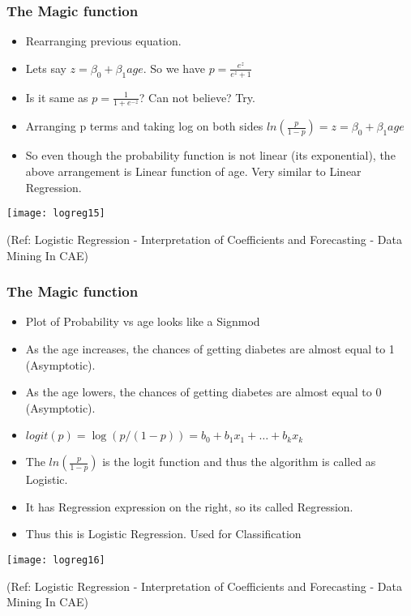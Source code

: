 \begin{frame}[fragile]\frametitle{The Magic function}
 \begin{itemize}
\item Rearranging previous equation.
\item Lets say $z = \beta_0 + \beta_1 age$. So we have $p = \frac{e^z}{e^z + 1}$
\item Is it same as $p = \frac{1}{1 + e^{-z}}$? Can not believe? Try.
\item Arranging p terms and taking log on both sides $ln(\frac{p}{1-p}) = z = \beta_0 + \beta_1 age$
\item So even though the probability function is not linear (its exponential), the above arrangement is Linear function of age. Very similar to Linear Regression.
\end{itemize}

\begin{center}
\texttt{[image: logreg15]}
\end{center}

{\tiny (Ref: Logistic Regression - Interpretation of Coefficients and Forecasting - Data Mining In CAE)}

\end{frame}

\begin{frame}[fragile]\frametitle{The Magic function}
 \begin{itemize}
\item Plot of Probability vs age looks like a Signmod
\item As the age increases, the chances of getting diabetes are almost equal to 1 (Asymptotic).
\item As the age lowers, the chances of getting diabetes are almost equal to 0 (Asymptotic).
\item $logit(p) = \log(p/(1-p)) = b_0 + b_1 x_1 +  \ldots + b_k x_k$
\item The $ln(\frac{p}{1-p})$ is the logit function and thus the algorithm is called as Logistic.
\item It has Regression expression on the right, so its called Regression.
\item Thus this is Logistic Regression. Used for Classification
\end{itemize}

\begin{center}
\texttt{[image: logreg16]}
\end{center}

{\tiny (Ref: Logistic Regression - Interpretation of Coefficients and Forecasting - Data Mining In CAE)}
\end{frame}

